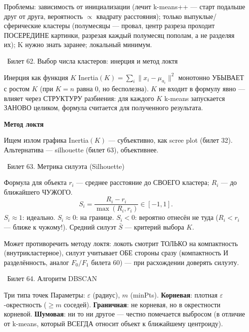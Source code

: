 \documentclass[12pt, a4paper]{article}
\newcommand{\bilet}[2]{%
  \vspace{10pt}%
  \noindent\colorbox{qcolor}{\parbox{\dimexpr\linewidth-2\fboxsep\relax}{%
    \color{white}\large\bfseries\strut\ Билет #1. #2%
  }}%
  \nopagebreak\vspace{5pt}\par\nopagebreak%
}
\newcommand{\qsub}[1]{%
  \vspace{5pt}%
  {\bfseries\color{defblue} #1}%
  \par\vspace{2pt}%
}
\begin{document}
\begin{fishkabox}
Проблемы: зависимость от инициализации (лечит k-means++ --- старт подальше друг от друга, вероятность $\propto$ квадрату расстояния); только выпуклые/сферические кластеры (полумесяцы --- провал, центр разреза проходит ПОСЕРЕДИНЕ картинки, разрезая каждый полумесяц пополам, а не разделяя их); K нужно знать заранее; локальный минимум.
\end{fishkabox}

\bilet{62}{Выбор числа кластеров: инерция и метод локтя}

\begin{propbox}{Инерция как функция $K$}
Inertia$(K)=\sum_i\|x_i-\mu_{a_i}\|^2$ монотонно УБЫВАЕТ с ростом $K$ (при $K{=}n$ равна 0, но бесполезна). $K$ не входит в формулу явно --- влияет через СТРУКТУРУ разбиения: для каждого $K$ k-means запускается ЗАНОВО целиком, формула считается для полученного результата.
\end{propbox}

\qsub{Метод локтя}
Ищем излом графика Inertia$(K)$ --- субъективно, как scree plot (билет 32). Альтернатива --- silhouette (билет 63), объективнее.

\bilet{63}{Метрика силуэта (Silhouette)}

\begin{defbox}{Формула для объекта}
$r_i$ --- среднее расстояние до СВОЕГО кластера; $R_i$ --- до ближайшего ЧУЖОГО.
\[
  S_i = \frac{R_i-r_i}{\max(R_i,r_i)} \in [-1,1].
\]
$S_i{\approx}1$: идеально. $S_i{\approx}0$: на границе. $S_i{<}0$: вероятно отнесён не туда ($R_i{<}r_i$ --- ближе к чужому!). Средний силуэт $\bar S$ --- критерий выбора $K$.
\end{defbox}

\begin{fishkabox}
Может противоречить методу локтя: локоть смотрит ТОЛЬКО на компактность (внутрикластерное), силуэт учитывает ОБЕ стороны сразу (компактность И разделённость, аналог $F_0/F_1$ билета 60) --- при расхождении доверять силуэту.
\end{fishkabox}

\bilet{64}{Алгоритм DBSCAN}

\begin{defbox}{Три типа точек}
Параметры: $\varepsilon$ (радиус), $m$ (minPts). \textbf{Корневая}: плотная $\varepsilon$-окрестность ($\ge m$ соседей). \textbf{Граничная}: не корневая, но в окрестности корневой. \textbf{Шумовая}: ни то ни другое --- честно помечается выбросом (в отличие от k-means, который ВСЕГДА относит объект к ближайшему центроиду).
\end{defbox}
\end{document}
